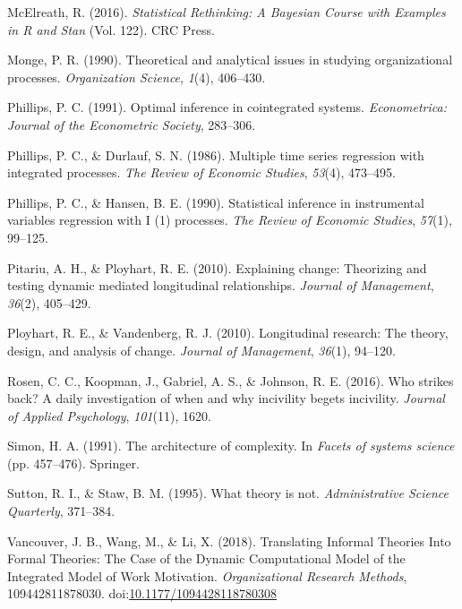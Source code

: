 \documentclass[english,,man]{apa6}
\theoremstyle{definition}
\theoremstyle{definition}
\theoremstyle{definition}
\theoremstyle{remark}
\begin{document}
\leavevmode\hypertarget{ref-mcelreath_statistical_2016}{}%
McElreath, R. (2016). \emph{Statistical Rethinking: A Bayesian Course
with Examples in R and Stan} (Vol. 122). CRC Press.

\leavevmode\hypertarget{ref-monge_theoretical_1990}{}%
Monge, P. R. (1990). Theoretical and analytical issues in studying
organizational processes. \emph{Organization Science}, \emph{1}(4),
406--430.

\leavevmode\hypertarget{ref-phillips_optimal_1991}{}%
Phillips, P. C. (1991). Optimal inference in cointegrated systems.
\emph{Econometrica: Journal of the Econometric Society}, 283--306.

\leavevmode\hypertarget{ref-phillips_multiple_1986}{}%
Phillips, P. C., \& Durlauf, S. N. (1986). Multiple time series
regression with integrated processes. \emph{The Review of Economic
Studies}, \emph{53}(4), 473--495.

\leavevmode\hypertarget{ref-phillips_statistical_1990}{}%
Phillips, P. C., \& Hansen, B. E. (1990). Statistical inference in
instrumental variables regression with I (1) processes. \emph{The Review
of Economic Studies}, \emph{57}(1), 99--125.

\leavevmode\hypertarget{ref-pitariu_explaining_2010}{}%
Pitariu, A. H., \& Ployhart, R. E. (2010). Explaining change: Theorizing
and testing dynamic mediated longitudinal relationships. \emph{Journal
of Management}, \emph{36}(2), 405--429.

\leavevmode\hypertarget{ref-ployhart_longitudinal_2010}{}%
Ployhart, R. E., \& Vandenberg, R. J. (2010). Longitudinal research: The
theory, design, and analysis of change. \emph{Journal of Management},
\emph{36}(1), 94--120.

\leavevmode\hypertarget{ref-rosen_who_2016}{}%
Rosen, C. C., Koopman, J., Gabriel, A. S., \& Johnson, R. E. (2016). Who
strikes back? A daily investigation of when and why incivility begets
incivility. \emph{Journal of Applied Psychology}, \emph{101}(11), 1620.

\leavevmode\hypertarget{ref-simon1991architecture}{}%
Simon, H. A. (1991). The architecture of complexity. In \emph{Facets of
systems science} (pp. 457--476). Springer.

\leavevmode\hypertarget{ref-sutton1995theory}{}%
Sutton, R. I., \& Staw, B. M. (1995). What theory is not.
\emph{Administrative Science Quarterly}, 371--384.

\leavevmode\hypertarget{ref-vancouver_translating_2018}{}%
Vancouver, J. B., Wang, M., \& Li, X. (2018). Translating Informal
Theories Into Formal Theories: The Case of the Dynamic Computational
Model of the Integrated Model of Work Motivation. \emph{Organizational
Research Methods}, 109442811878030.
doi:\href{https://doi.org/10.1177/1094428118780308}{10.1177/1094428118780308}
\end{document}
